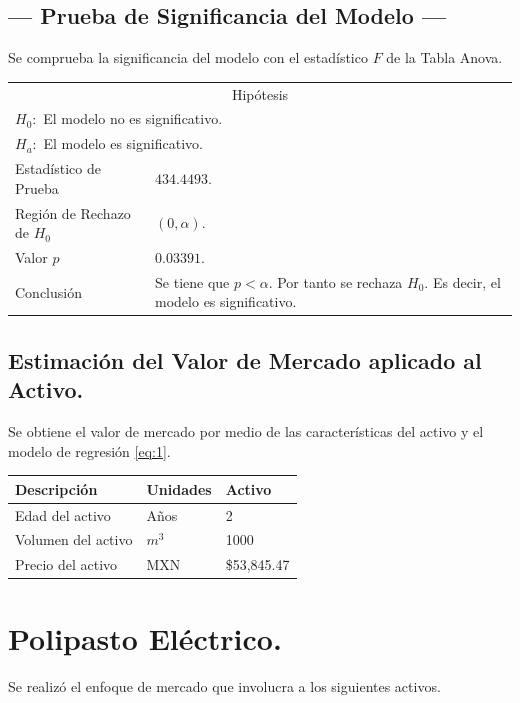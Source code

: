 \subsection{\centering --- Prueba de Significancia del Modelo ---} %
Se comprueba la significancia del modelo con el estadístico \(F\) de la Tabla Anova.
\begin{center}
  \begin{tabular}{|l|p{6cm}|}
    \cline{1-2}
    \multicolumn{2}{|c|}{Hipótesis}\\ \cline{1-2}
    \multicolumn{2}{|l|}{\(H_0:\) El modelo no es significativo.} \\ 
    \multicolumn{2}{|l|}{\(H_a:\) El modelo es significativo.} \\ \cline{1-2}
    Estadístico de Prueba & \(434.4493\).\\ \cline{1-2} 
		Región de Rechazo de \(H_0\) & \((0, \alpha )\).\\ \cline{1-2} 
    Valor \(p\) & \(0.03391\).\\ \cline{1-2} 
    Conclusión & Se tiene que \(p<\alpha\). \newline 
		Por tanto se rechaza \(H_0\). \newline 
		Es decir, el modelo es significativo.\\ \cline{1-2} 
  \end{tabular}
\end{center} 

\subsection{\centering Estimación del Valor de Mercado aplicado al Activo.} %
Se obtiene el valor de mercado por medio de las características del activo y el modelo de regresión \eqref{eq:1}.
\begin{center}
  \begin{tabular}{|l|l|l|}
    \hline 
		Descripción   & Unidades  & Activo \\ \hline 
    Edad del activo    & Años      & 2      \\ \hline 
		Volumen del activo & \(m ^ 3\) & 1000   \\ \hline 
		Precio del activo   & MXN       & \$53,845.47 \\ \hline 
  \end{tabular}
\end{center} 


\section{Polipasto Eléctrico.} %
Se realizó el enfoque de mercado que involucra a los siguientes activos.

